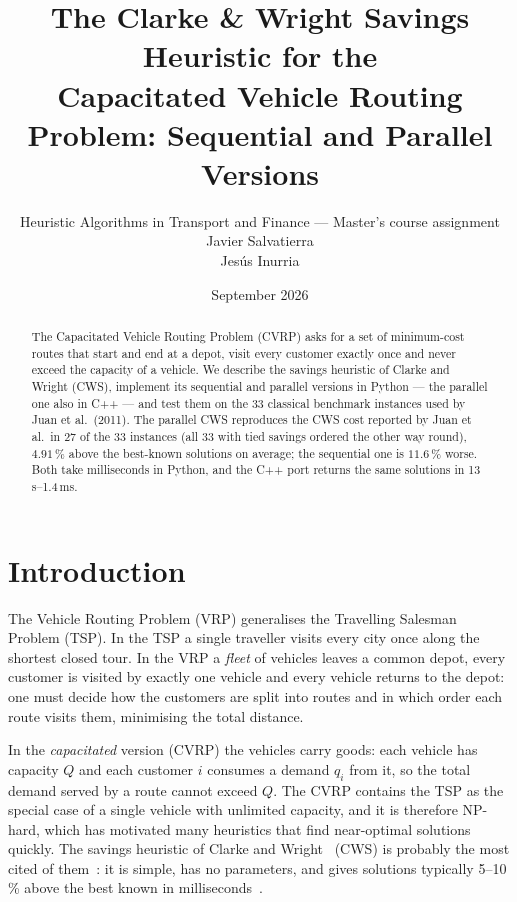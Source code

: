 \documentclass[10pt,a4paper]{article}
\title{\vspace{-1.2cm}\bfseries The Clarke \& Wright Savings Heuristic for the\\
Capacitated Vehicle Routing Problem: Sequential and Parallel Versions}
\author{Heuristic Algorithms in Transport and Finance --- Master's course assignment \\
    Javier Salvatierra \\
    Jesús Inurria
}
\date{September 2026}
\begin{document}
\maketitle
\vspace{-0.8cm}

\begin{abstract}
\noindent\small
The Capacitated Vehicle Routing Problem (CVRP) asks for a set of minimum-cost routes that start and end
at a depot, visit every customer exactly once and never exceed the capacity of a vehicle. We describe
the savings heuristic of Clarke and Wright (CWS), implement its sequential and parallel versions in
Python --- the parallel one also in C++ --- and test them on the 33 classical benchmark instances used
by Juan et al.~(2011). The parallel CWS reproduces the CWS cost reported by Juan et al.\ in 27 of the 33
instances (all 33 with tied savings ordered the other way round), $4.91\,\%$ above the best-known
solutions on average; the sequential one is $11.6\,\%$ worse. Both take milliseconds in Python, and
the C++ port returns the same solutions in 13\,\textmu s--1.4\,ms.
\end{abstract}

\section{Introduction}

The Vehicle Routing Problem (VRP) generalises the
Travelling Salesman Problem (TSP). In the TSP a single traveller visits every city once along the
shortest closed tour. In the VRP a \emph{fleet} of vehicles leaves a common depot, every customer is
visited by exactly one vehicle and every vehicle returns to the depot: one must decide how the customers
are split into routes and in which order each route visits them, minimising the total distance.

In the \emph{capacitated} version (CVRP) the vehicles carry goods: each vehicle has capacity $Q$ and each
customer $i$ consumes a demand $q_i$ from it, so the total demand served by a route cannot exceed $Q$.
The CVRP contains the TSP as the special case of a single vehicle with unlimited capacity, and it is
therefore NP-hard, which has motivated many heuristics that find near-optimal solutions quickly. The savings heuristic of Clarke
and Wright~\cite{cw1964} (CWS) is probably the most cited of them~\cite{juan2011}: it is simple, has no
parameters, and gives solutions typically 5--10\,\% above the best known in milliseconds~\cite{slides}.
\end{document}
